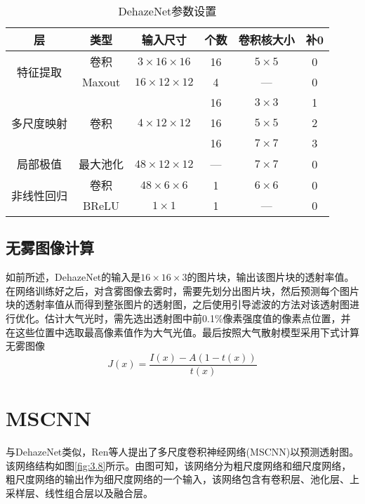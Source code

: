 \documentclass[a4paper, 12pt, oneside]{report}
\begin{document}
{%
\begin{table}[htbp]
  \centering
  \caption{DehazeNet参数设置}
    \begin{tabular}{c|c|c|c|c|c}
    \hline
    层     & 类型    & 输入尺寸  & 个数    & 卷积核大小 & 补0 \\
    \hline
    \multirow{2}[1]{*}{特征提取} & 卷积    & $3 \times 16 \times 16$ & 16    & $5 \times 5$ & 0 \\
          & Maxout & $16 \times 12 \times 12$ & 4     & —     & 0 \\
	\hline
    \multirow{3}[0]{*}{多尺度映射} & \multirow{3}[0]{*}{卷积} & \multirow{3}[0]{*}{$4 \times 12 \times 12$} & 16    & $3 \times 3$ & 1 \\
          &       &       & 16    & $5 \times 5$ & 2 \\
          &       &       & 16    & $7 \times 7$ & 3 \\
	\hline
    局部极值  & 最大池化  & $48 \times 12 \times 12$ & —     & $7 \times 7$ & 0 \\
	\hline
    \multirow{2}[1]{*}{非线性回归} & 卷积    & $48 \times 6 \times 6$ & 1     & $6 \times 6$ & 0 \\
          & BReLU & $1 \times 1$ & 1     & —     & 0 \\
    \hline
    \end{tabular}%
  \label{tab:3.1}%
\end{table}%

\subsection{无雾图像计算\quad}
如前所述，DehazeNet的输入是$16 \times 16 \times 3$的图片块，输出该图片块的透射率值。在网络训练好之后，对含雾图像去雾时，需要先划分出图片块，然后预测每个图片块的透射率值从而得到整张图片的透射图，之后使用引导滤波的方法对该透射图进行优化。估计大气光时，需先选出透射图中前0.1\%像素强度值的像素点位置，并在这些位置中选取最高像素值作为大气光值。最后按照大气散射模型采用下式计算无雾图像
\begin{equation}\label{eq:3.4}
J(x) = \frac{I(x) - A(1 - t(x))}{t(x)}
\end{equation}

\section{MSCNN\quad}
与DehazeNet类似，Ren\cite{ref17}等人提出了多尺度卷积神经网络(MSCNN)以预测透射图。该网络结构如图\ref{fig:3.8}所示。由图可知，该网络分为粗尺度网络和细尺度网络，粗尺度网络的输出作为细尺度网络的一个输入，该网络包含有卷积层、池化层、上采样层、线性组合层以及融合层。

}
\end{document}
